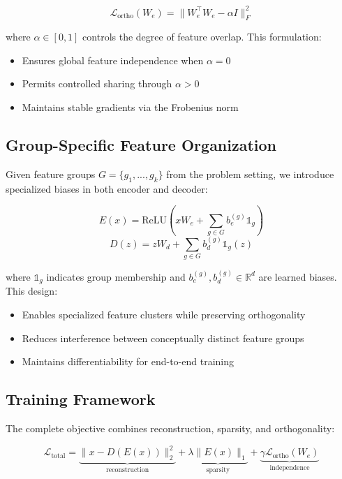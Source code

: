 \documentclass{article} %
\begin{document}
\begin{equation}
    \mathcal{L}_{\text{ortho}}(W_e) = \|W_e^{\top}W_e - \alpha I\|_F^2
\end{equation}

where $\alpha \in [0,1]$ controls the degree of feature overlap. This formulation:
\begin{itemize}
    \item Ensures global feature independence when $\alpha=0$
    \item Permits controlled sharing through $\alpha>0$
    \item Maintains stable gradients via the Frobenius norm
\end{itemize}

\subsection{Group-Specific Feature Organization} 
Given feature groups $G=\{g_1,...,g_k\}$ from the problem setting, we introduce specialized biases in both encoder and decoder:

\begin{equation}
    E(x) = \text{ReLU}(xW_e + \sum_{g \in G} b_e^{(g)}\mathbb{1}_g)
\end{equation}
\begin{equation}
    D(z) = zW_d + \sum_{g \in G} b_d^{(g)}\mathbb{1}_g(z)
\end{equation}

where $\mathbb{1}_g$ indicates group membership and $b_e^{(g)}, b_d^{(g)} \in \mathbb{R}^d$ are learned biases. This design:
\begin{itemize}
    \item Enables specialized feature clusters while preserving orthogonality
    \item Reduces interference between conceptually distinct feature groups
    \item Maintains differentiability for end-to-end training
\end{itemize}

\subsection{Training Framework}
The complete objective combines reconstruction, sparsity, and orthogonality:

\begin{equation}
    \mathcal{L}_{\text{total}} = \underbrace{\|x - D(E(x))\|_2^2}_{\text{reconstruction}} + \underbrace{\lambda\|E(x)\|_1}_{\text{sparsity}} + \underbrace{\gamma\mathcal{L}_{\text{ortho}}(W_e)}_{\text{independence}}
\end{equation}
\end{document}
